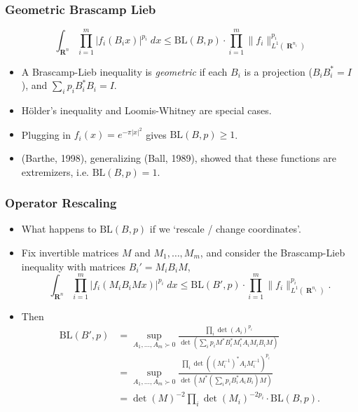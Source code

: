 \documentclass[usenames,dvipsnames,12pt]{beamer}
\DeclareMathOperator{\RR}{\mathbf{R}}
\begin{document}
\begin{frame}
    \frametitle{Geometric Brascamp Lieb}

    \vspace{-1.5em}
    \[ \int_{\RR^n} \prod_{i = 1}^m |f_i(B_i x)|^{p_i}\; dx \leq \text{BL}(B,p) \cdot \prod_{i = 1}^m \| f_i \|_{L^1(\RR^{n_i})}^{p_i} \]

    \begin{itemize}
        \pause
        \item A Brascamp-Lieb inequality is \emph{geometric} if each $B_i$ is a projection ($B_i B_i^* = I$), and $\sum_i p_i B_i^* B_i = I$.

        \pause
        \item H\"{o}lder's inequality and Loomis-Whitney are special cases.

        \pause
        \item Plugging in $f_i(x) = e^{-\pi |x|^2}$ gives $\text{BL}(B,p) \geq 1$.

        \pause
        \item (Barthe, 1998), generalizing (Ball, 1989), showed that these functions are extremizers, i.e. $\text{BL}(B,p) = 1$.
    \end{itemize}
\end{frame}

\begin{frame}
    \frametitle{Operator Rescaling}

    \begin{itemize}
        \item What happens to $\text{BL}(B,p)$ if we `rescale / change coordinates'.

        \pause
        \item Fix invertible matrices $M$ and $M_1, \dots, M_m$, and consider the Brascamp-Lieb inequality with matrices $B_i' = M_i B_i M$,
        \[ \int_{\RR^n} \prod_{i = 1}^m |f_i(M_i B_i M x)|^{p_i}\; dx \leq \text{BL}(B',p) \cdot \prod_{i = 1}^m \| f_i \|_{L^1(\RR^{n_i})}^{p_i}. \]
        \pause
        \item Then
        \begin{align*}
            \text{BL}(B',p) &= \sup_{A_1,\dots,A_m \succ 0} \frac{\prod_i \det(A_i)^{p_i}}{\det(\sum_i p_i M^* B_i^* M_i^* A_i M_i B_i M)}\\
            &= \sup_{A_1,\dots,A_m \succ 0} \frac{\prod_i \det((M_i^{-1})^* A_i M_i^{-1})^{p_i}}{\det(M^* (\sum_i p_i B_i^* A_i B_i) M)}\\
            &= \det(M)^{-2} \prod_i \det(M_i)^{-2p_i} \cdot \text{BL}(B,p). 
        \end{align*}
    \end{itemize}
\end{frame}
\end{document}
